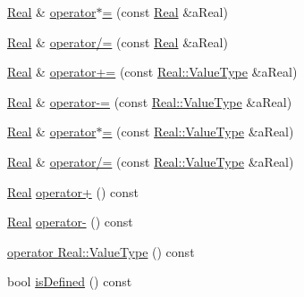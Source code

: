 \begin{DoxyCompactItemize}
\item 
\hyperlink{classostk_1_1core_1_1types_1_1_real}{Real} \& \hyperlink{classostk_1_1core_1_1types_1_1_real_a3ca9f269e1a84c4b3f1a4a9347fa37ad}{operator$\ast$=} (const \hyperlink{classostk_1_1core_1_1types_1_1_real}{Real} \&a\+Real)
\item 
\hyperlink{classostk_1_1core_1_1types_1_1_real}{Real} \& \hyperlink{classostk_1_1core_1_1types_1_1_real_a86e0dad5db89606b6cdbaaffd0d0e26c}{operator/=} (const \hyperlink{classostk_1_1core_1_1types_1_1_real}{Real} \&a\+Real)
\item 
\hyperlink{classostk_1_1core_1_1types_1_1_real}{Real} \& \hyperlink{classostk_1_1core_1_1types_1_1_real_a62dd98b444f922a5195bcb647b74700a}{operator+=} (const \hyperlink{classostk_1_1core_1_1types_1_1_real_aa26f796c30b514c98d573f82e3b02296}{Real\+::\+Value\+Type} \&a\+Real)
\item 
\hyperlink{classostk_1_1core_1_1types_1_1_real}{Real} \& \hyperlink{classostk_1_1core_1_1types_1_1_real_acfe92cf33b9c0752041d5966867105f8}{operator-\/=} (const \hyperlink{classostk_1_1core_1_1types_1_1_real_aa26f796c30b514c98d573f82e3b02296}{Real\+::\+Value\+Type} \&a\+Real)
\item 
\hyperlink{classostk_1_1core_1_1types_1_1_real}{Real} \& \hyperlink{classostk_1_1core_1_1types_1_1_real_aca5f3766cb3c9d15874e7d742fb01286}{operator$\ast$=} (const \hyperlink{classostk_1_1core_1_1types_1_1_real_aa26f796c30b514c98d573f82e3b02296}{Real\+::\+Value\+Type} \&a\+Real)
\item 
\hyperlink{classostk_1_1core_1_1types_1_1_real}{Real} \& \hyperlink{classostk_1_1core_1_1types_1_1_real_aa446982652f6a965deb3bcf918bbe011}{operator/=} (const \hyperlink{classostk_1_1core_1_1types_1_1_real_aa26f796c30b514c98d573f82e3b02296}{Real\+::\+Value\+Type} \&a\+Real)
\item 
\hyperlink{classostk_1_1core_1_1types_1_1_real}{Real} \hyperlink{classostk_1_1core_1_1types_1_1_real_a65959c19e50424f370c66fa41464b446}{operator+} () const
\item 
\hyperlink{classostk_1_1core_1_1types_1_1_real}{Real} \hyperlink{classostk_1_1core_1_1types_1_1_real_ae63a32df9df0c3dd7149393b30f471f9}{operator-\/} () const
\item 
\hyperlink{classostk_1_1core_1_1types_1_1_real_ab120fe8013a5d9bf397e3b439464ec64}{operator Real\+::\+Value\+Type} () const
\item 
bool \hyperlink{classostk_1_1core_1_1types_1_1_real_a2bb66a85d27b742c2b816ef16e85583c}{is\+Defined} () const
\item 

\end{DoxyCompactItemize}
